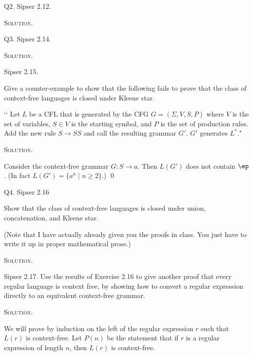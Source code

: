 

\newpage
Q2. Sipser 2.12.

\textsc{Solution}.



\newpage
Q3. Sipser 2.14.

\textsc{Solution}.



\newpage
Sipser 2.15.

Give a counter-example to show that the following fails to prove
that the class of context-free languages is closed under Kleene
star.

\lq\lq
Let $L$ be a CFL that is generated by the CFG
$G = (\Sigma, V, S, P)$ where $V$ is the set of variables,
$S \in V$ is the starting symbol, and $P$ is the set of production rules.
Add the new rule $S \rightarrow SS$ and call the resulting
grammar $G'$.
$G'$ generates $L^*$."

\textsc{Solution}.

Consider the context-free grammar $G: S \rightarrow a$.
Then $L(G')$ does not contain $\ep$.
(In fact $L(G') = \{a^n \mid n \geq 2\}$.)
\qed

\newpage
Q4. Sipser 2.16

Show that the class of context-free languages is closed under
union, concatenation, and Kleene star.

(Note that I have actually already given you the proofs in class.
You just have to write it up in proper mathematical prose.)

\textsc{Solution}.



\newpage
Sipser 2.17.
Use the results of Exercise 2.16 to give another proof that
every regular language is context free, by showing how to convert
a regular expression directly to an equivalent context-free
grammar.

\textsc{Solution}.

We will prove by induction on the left of the regular expression $r$
such that $L(r)$ is context-free.
Let $P(n)$ be the statement that if $r$ is a regular expression
of length $n$, then $L(r)$ is context-free.

